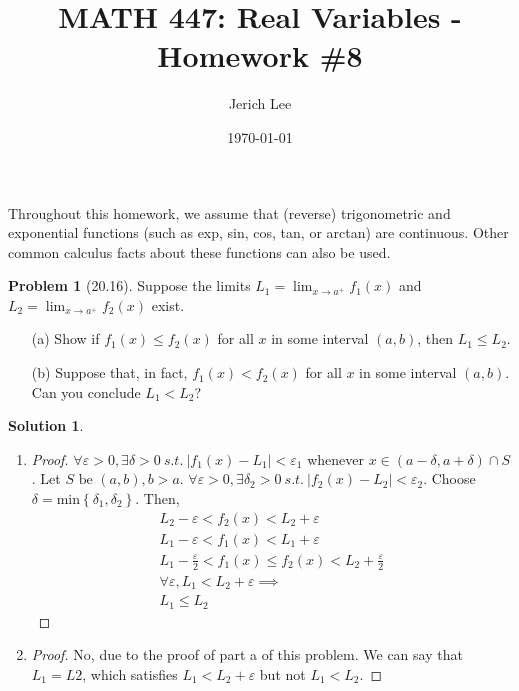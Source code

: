 \documentclass[12pt]{article}
\title{MATH 447: Real Variables - Homework \#8}
\author{Jerich Lee}
\date{\today}
\theoremstyle{definition} %
\newtheorem{solution}{Solution}
\newtheorem{problem}{Problem}
\theoremstyle{plain} %
\begin{document}
\maketitle
Throughout this homework, we assume that (reverse) trigonometric and exponential functions (such as exp, sin, cos, tan, or arctan) are continuous. Other common calculus facts about these functions can also be used.
\begin{problem}[20.16]
    Suppose the limits $ L_1 = \lim_{x \to a^+} f_1(x) $ and $ L_2 = \lim_{x \to a^+} f_2(x) $ exist.

\begin{enumerate}
    \item[(a)] Show if $ f_1(x) \leq f_2(x) $ for all $ x $ in some interval $ (a, b) $, then $ L_1 \leq L_2 $.
    \item[(b)] Suppose that, in fact, $ f_1(x) < f_2(x) $ for all $ x $ in some interval $ (a, b) $. Can you conclude $ L_1 < L_2 $?
\end{enumerate}
\end{problem}
\begin{solution}
\begin{enumerate}
\item \begin{proof}
    $\forall \varepsilon>0, \exists \delta >0 \ s.t. \ \left\vert f_1(x)-L_1 \right\vert <\varepsilon_1$ whenever $x\in (a- \delta, a+\delta)\cap S$. Let $S \text{ be }  (a,b), b>a$. $\forall \varepsilon>0, \exists \delta_2 >0 \ s.t. \ \left\vert f_2(x)-L_2 \right\vert <\varepsilon_2$. Choose $\delta = \text{min}\left\{ \delta_1, \delta_2 \right\}$. Then,
    \begin{align}
        L_2 - \varepsilon < f_2(x) < L_2 + \varepsilon \\[10pt] 
        L_1 - \varepsilon < f_1(x) < L_1 + \varepsilon \\[10pt] 
        L_1 - \frac{\varepsilon}{2} < f_1(x) \leq f_2(x) <L_2 +\frac{\varepsilon}{2} \\[10pt] 
        \forall \varepsilon, L_1 < L_2 + \varepsilon \implies \\[10pt] 
        L_1 \leq L_2
    \end{align} 
\end{proof}
\item \begin{proof}
    No, due to the proof of part a of this problem. We can say that $L_1=L2$, which satisfies $L_1<L_{2}+\varepsilon$ but not $L_1 < L_2$. 
\end{proof}
\end{enumerate}    
\end{solution}
\end{document}
